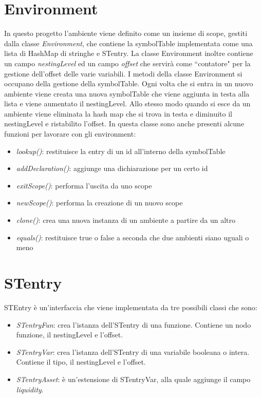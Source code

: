 \documentclass[12pt, a4paper]{report}
\begin{document}
 \section{Environment}
 In questo progetto l’ambiente viene definito come un insieme di scope, gestiti dalla classe \emph{Environment}, che contiene la symbolTable implementata come una lista di HashMap di stringhe e STentry. La classe Environment inoltre contiene un campo \emph{nestingLevel} ed un campo \emph{offset} che servirà come ``contatore" per la gestione dell'offset delle varie variabili. I metodi della classe Environment si occupano della gestione della symbolTable. Ogni volta che si entra in un nuovo ambiente viene creata una nuova symbolTable che viene aggiunta in testa alla lista e viene aumentato il nestingLevel. Allo stesso modo quando si esce da un ambiente viene eliminata la hash map che si trova in testa e diminuito il nestingLevel e ristabilito l'offset. In questa classe sono anche presenti alcune funzioni per lavorare con gli environment:
 \begin{itemize}
    \item \emph{lookup()}: restituisce la entry di un id all'interno della symbolTable
    \item \emph{addDeclaration()}: aggiunge una dichiarazione per un certo id
    \item \emph{exitScope()}: performa l'uscita da uno scope
    \item \emph{newScope()}: performa la creazione di un nuovo scope
    \item \emph{clone()}: crea una nuova instanza di un ambiente a partire da un altro  
    \item \emph{equals()}: restituisce true o false a seconda che due ambienti siano uguali o meno 
 \end{itemize}

 \section{STentry}
 STEntry è un'interfaccia che viene implementata da tre possibili classi che sono:
 \begin{itemize}
    \item \emph{STentryFun}: crea l'istanza dell'STentry di una funzione. Contiene un nodo funzione, il nestingLevel e l'offset.
    \item \emph{STentryVar}: crea l'istanza dell'STentry di una variabile booleana o intera. Contiene il tipo, il nestingLevel e l'offset.
    \item \emph{STentryAsset}: è un'estensione di STentryVar, alla quale aggiunge il campo \emph{liquidity}.
 \end{itemize}
\end{document}
